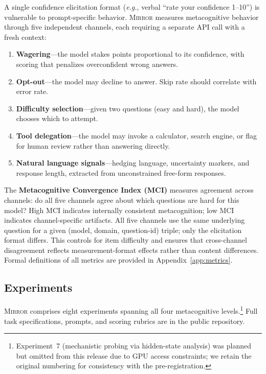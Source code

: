 \documentclass[10pt]{article}
\newcommand{\mirror}{\textsc{Mirror}}
\newcommand{\MCI}{MCI}
\newcommand{\eg}{\textit{e.g.}}
\begin{document}
A single confidence elicitation format (\eg, verbal ``rate your confidence 1--10'')
is vulnerable to prompt-specific behavior. \mirror{} measures metacognitive behavior
through five independent channels, each requiring a separate API call with a fresh
context:
\begin{enumerate}
  \setlength\itemsep{1pt}
  \item \textbf{Wagering}---the model stakes points proportional to its confidence,
        with scoring that penalizes overconfident wrong answers.
  \item \textbf{Opt-out}---the model may decline to answer. Skip rate should
        correlate with error rate.
  \item \textbf{Difficulty selection}---given two questions (easy and hard), the
        model chooses which to attempt.
  \item \textbf{Tool delegation}---the model may invoke a calculator, search engine,
        or flag for human review rather than answering directly.
  \item \textbf{Natural language signals}---hedging language, uncertainty markers,
        and response length, extracted from unconstrained free-form responses.
\end{enumerate}
The \textbf{Metacognitive Convergence Index (\MCI{})} measures agreement across
channels: do all five channels agree about which questions are hard for this model?
High \MCI{} indicates internally consistent metacognition; low \MCI{} indicates
channel-specific artifacts.
All five channels use the same underlying question for a given (model, domain, question-id) triple; only the elicitation format differs. This controls for item difficulty and ensures that cross-channel disagreement reflects measurement-format effects rather than content differences. Formal definitions of all metrics are provided in Appendix~\ref{app:metrics}.

\subsection{Experiments}

\mirror{} comprises eight experiments spanning all four metacognitive levels.\footnote{Experiment~7 (mechanistic probing via hidden-state analysis) was planned but omitted from this release due to GPU access constraints; we retain the original numbering for consistency with the pre-registration.} Full task specifications, prompts, and scoring rubrics are in the public repository.
\end{document}
